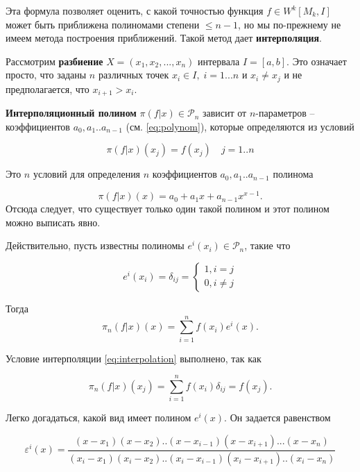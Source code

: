 Эта формула позволяет оценить, с какой точностью функция $f \in W^k[M_k, I]$ может быть приближена полиномами степени $\leq n-1$, но мы по-прежнему не имеем метода построения приближений.
Такой метод дает \textbf{интерполяция}.

Рассмотрим \textbf{разбиение} $X = (x_1, x_2,..., x_n)$ интервала $I = [a, b]$. Это означает просто, что заданы $n$ различных точек $x_i \in I, \; i = 1 ... n$ и $x_i \neq x_j$ и не предполагается, что $x_{i+1} > x_i$.

\textbf{Интерполяционный полином} $\pi(f|x) \in \mathscr{P}_n $ зависит от $n$-параметров -- коэффициентов $a_0, a_1 .. a_{n-1}$ (см. \ref{eq:polynom}), которые определяются из условий

\begin{equation}\label{eq:interpolation}
\pi(f|x)(x_j) = f(x_j) \quad j = 1 .. n
\end{equation}

Это $n$ условий для определения $n$ коэффициентов  $a_0, a_1 .. a_{n-1}$ полинома

\begin{equation}
\pi(f|x)(x) = a_0 + a_1x + a_{n-1}x^{x-1}.
\end{equation}
Отсюда следует, что существует только один такой полином и этот полином можно выписать явно. 

Действительно, пусть известны полиномы $e^i(x_i) \in \mathscr{P}_n $, такие что

\begin{equation}
e^i(x_i)= \delta_{ij} =
\begin{cases}
1, i = j \\
0, i \neq j

\end{cases}
\end{equation}

Тогда 
\begin{equation} \label{eq:2.19}
\pi_n(f|x)(x) = \sum_{i = 1}^{n} f(x_i)e^i(x).
\end{equation}

Условие интерполяции \ref{eq:interpolation} выполнено, так как 

\begin{equation}
\pi_n(f|x)(x_j) = \sum_{i = 1}^{n} f(x_i)\delta_{ij} = f(x_j).
\end{equation}

Легко догадаться, какой вид имеет полином $e^i(x)$. Он задается равенством 

\begin{equation} \label{eq:2.21}
\varepsilon^i(x) = \frac{(x-x_1)(x-x_2)..(x-x_{i-1})(x-x_{i+1}) ...(x-x_n)}{(x_i-x_1)(x_i-x_2)..(x_i-x_{i-1})(x_i-x_{i+1})..(x_i - x_n )}
\end{equation}

